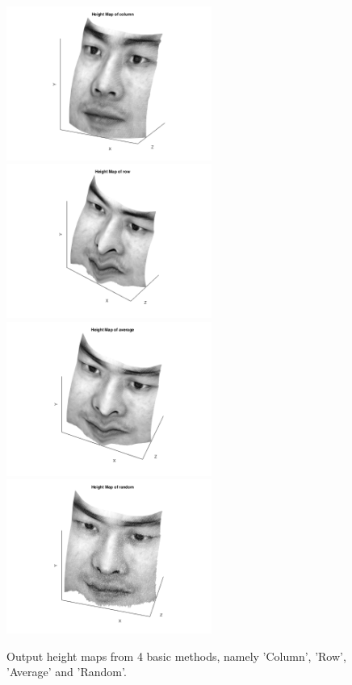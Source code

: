 \documentclass[a4paper]{article}
\begin{document}
\begin{figure}[h!]
\includegraphics[width=0.6\textwidth]{imgs/2col.png}
\includegraphics[width=0.6\textwidth]{imgs/2row.png}
\includegraphics[width=0.6\textwidth]{imgs/2ave.png}
\includegraphics[width=0.6\textwidth]{imgs/2ran.png}
\caption{\label{fig:comp_int} Output height maps from 4 basic methods, namely 'Column', 'Row', 'Average' and 'Random'.}
\end{figure}
\end{document}
